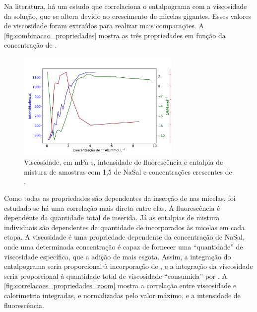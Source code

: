 	Na literatura, há um estudo que correlaciona o entalpograma com a viscosidade da solução, que se altera devido ao crescimento de micelas gigantes.\cite{Ito2015c} Esses valores de viscosidade foram extraídos para realizar mais comparações. A \autoref{fig:combinacao_propriedades} mostra as três propriedades em função da concentração de \TTAB.
	
	\begin{figure}[h]
		\centering
		\includegraphics[width=0.7\textwidth]{imagens/fluor/combinacao_propriedades}
		\caption{Viscosidade, em mPa s, intensidade de fluorescência e entalpia de mistura de amostras com 1,5 \mM{} de NaSal e concentrações crescentes de \TTAB.}
		\label{fig:combinacao_propriedades}
	\end{figure} 
	
	Como todas as propriedades são dependentes da inserção de \Sal{} nas micelas, foi estudado se há uma correlação mais direta entre elas. A fluorescência é dependente da quantidade total de \Sal{} inserida. Já as entalpias de mistura individuais são dependentes da quantidade de \Sal{} incorporados às micelas em cada etapa. A viscosidade é uma propriedade dependente da concentração de NaSal, onde uma determinada concentração é capaz de fornecer uma ``quantidade'' de viscosidade específica, que a adição de mais \TTAB{} esgota. Assim, a integração do entalpograma seria proporcional à incorporação de \Sal{}, e a integração da viscosidade seria proporcional à quantidade total de viscosidade ``consumida'' por \TTAB. A  \autoref{fig:correlacoes_propriedades_zoom} mostra a correlação entre viscosidade e calorimetria integradas, e normalizadas pelo valor máximo, e a intensidade de fluorescência.
	
